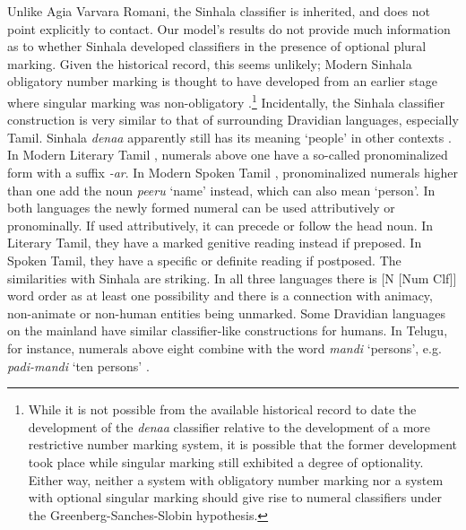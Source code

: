 \documentclass[11pt]{article}
\begin{document}
Unlike Agia Varvara Romani, the Sinhala classifier is inherited, and does not point explicitly to contact. 
Our model's results do not provide much information as to whether Sinhala developed classifiers in the presence of optional plural marking. 
Given the historical record, this seems unlikely; 
Modern Sinhala obligatory number marking is thought to have developed from an earlier stage where singular marking was non-obligatory \citep{NitzNordhoff2010}.\footnote{While it is not possible from the available historical record to date the development of the {\it denaa} classifier relative to the development of a more restrictive number marking system, it is possible that the former development took place while singular marking still exhibited a degree of optionality. Either way, neither a system with obligatory number marking nor a system with optional singular marking should give rise to numeral classifiers under the Greenberg-Sanches-Slobin hypothesis.} 
Incidentally, the Sinhala classifier construction is very similar to that of surrounding Dravidian languages, especially Tamil.  Sinhala {\it denaa} apparently still has its meaning `people' in other contexts \citep[passim]{Chandralal2010}. 
In Modern Literary Tamil \citep[112--114]{Lehmann1993}, numerals above one have a so-called pronominalized form with a suffix {\it -ar}. In Modern Spoken Tamil \citep[132--135]{Schiffmann1999}, pronominalized numerals higher than one add the noun {\it peeru} `name' instead, which can also mean `person'. In both languages the newly formed numeral can be used attributively or pronominally. If used attributively, it can precede or follow the head noun. In Literary Tamil, they have a marked genitive reading instead if preposed. In Spoken Tamil, they have a specific or definite reading if postposed. The similarities with Sinhala are striking. In all three languages there is [N [Num Clf]] word order as at least one possibility and there is a connection with animacy, non-animate or non-human entities being unmarked. Some Dravidian languages on the mainland have similar classifier-like constructions for humans. In Telugu, for instance, numerals above eight combine with the word {\it mandi} `persons', e.g. {\it padi-mandi} `ten persons' \citep[106--109]{KrishnamurtiGwynn1985}. %
\end{document}
